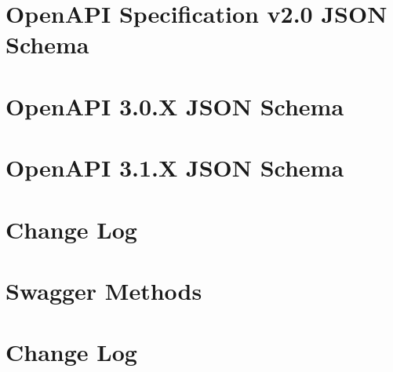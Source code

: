 \documentclass[twoside]{book}
\newcommand{\+}{\discretionary{\mbox{\scriptsize$\hookleftarrow$}}{}{}}
\begin{document}
\chapter{Open\+API Specification v2.0 JSON Schema}
\label{md_src_nodejs_node_modules__apidevtools_openapi_schemas_schemas_v2_0_README}

\chapter{Open\+API 3.0.X JSON Schema}
\label{md_src_nodejs_node_modules__apidevtools_openapi_schemas_schemas_v3_0_README}

\chapter{Open\+API 3.1.X JSON Schema}
\label{md_src_nodejs_node_modules__apidevtools_openapi_schemas_schemas_v3_1_README}

\chapter{Change Log}
\label{md_src_nodejs_node_modules__apidevtools_swagger_methods_CHANGELOG}

\chapter{Swagger Methods}
\label{md_src_nodejs_node_modules__apidevtools_swagger_methods_README}

\chapter{Change Log}
\label{md_src_nodejs_node_modules__apidevtools_swagger_parser_CHANGELOG}

\end{document}
